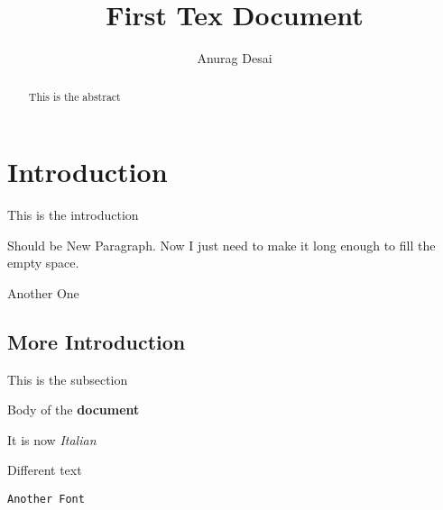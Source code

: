 \documentclass{article}
\begin{document}
	\title{First Tex Document}
	\author{Anurag Desai}
	\maketitle
	\begin{abstract}
		This is the abstract
	\end{abstract}
	\section{Introduction}
	This is the introduction
	
	Should be New Paragraph. Now I just need to make it long enough to fill the empty space.
	
	Another One
	
	\subsection{More Introduction}
	This is the subsection
	
	Body of the \textbf{document}
	
	It is now \textit{Italian}
	
	\textsf{Different text}
	
	\texttt{Another Font}
	
\end{document}

